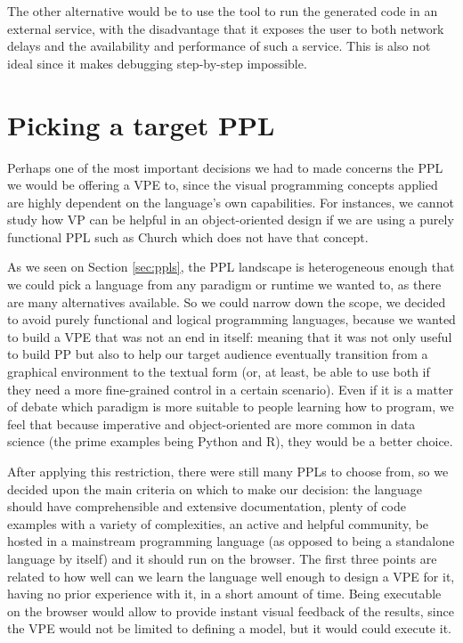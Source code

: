 The other alternative would be to use the tool to run the generated code in an
external service, with the disadvantage that it exposes the user to both network
delays and the availability and performance of such a service. This is also not
ideal since it makes debugging step-by-step impossible.

\section{Picking a target PPL}
\label{sec:tarppl}

Perhaps one of the most important decisions we had to made concerns the PPL we
would be offering a VPE to, since the visual programming concepts applied are
highly dependent on the language's own capabilities. For instances, we cannot
study how VP can be helpful in an object-oriented design if we are using a
purely functional PPL such as Church which does not have that concept.

As we seen on Section \ref{sec:ppls}, the PPL landscape is heterogeneous enough
that we could pick a language from any paradigm or runtime we wanted to, as there
are many alternatives available. So we could narrow down the scope, we decided to avoid
purely functional and logical programming languages, because we wanted to build
a VPE that was not an end in itself: meaning that it was not only useful to build
PP but also to help our target audience eventually transition from a graphical
environment to the textual form (or, at least, be able to use both if they need
a more fine-grained control in a certain scenario). Even if it is a matter of
debate which paradigm is more suitable to people learning how to program, we feel
that because imperative and object-oriented are more common in data science (the prime
examples being Python and R), they would be a better choice.

After applying this restriction, there were still many PPLs to choose from, so
we decided upon the main criteria on which to make our decision: the language
should have comprehensible and extensive documentation, plenty of code examples
with a variety of complexities, an active and helpful community, be hosted in
a mainstream programming language (as opposed to being a standalone language by itself)
and it should run on the browser. The first three points are related to how well
can we learn the language well enough to design a VPE for it, having no prior
experience with it, in a short amount of time. Being executable on the browser
would allow to provide instant visual feedback of the results, since the VPE
would not be limited to defining a model, but it would could execute it.

